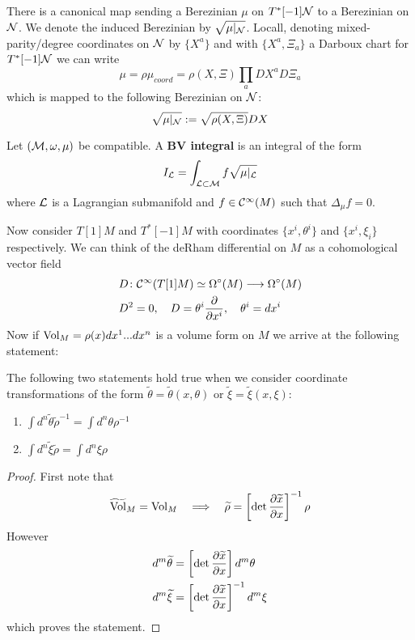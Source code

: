 
There is a canonical map sending a Berezinian $\mu$ on $T^*[-1]\mathcal{N}$ to a Berezinian on $\mathcal{N}$. We denote the induced Berezinian by $\sqrt{\mu|_{\mathcal{N}}}$. Locall, denoting mixed-parity/degree coordinates on $\mathcal{N}$ by $\{X^a\}$ and with $\{X^a, \Xi_a \}$ a Darboux chart for $T^*[-1]\mathcal{N}$ we can write
\begin{equation}
  \mu = \rho \mu_{coord} = \rho(X, \Xi) \prod_a DX^a D\Xi_a
\end{equation}
which is mapped to the following Berezinian on $\mathcal{N}$:
\begin{equation}
  \sqrt{\mu|_{\mathcal{N}}} := \sqrt{\rho(X, \Xi)} DX
\end{equation}

\begin{definition}[BV Integral]
  Let $(\mathcal{M}, \omega, \mu)$ be compatible. A \textbf{BV integral} is an integral of the form
  \begin{equation}
    I_{\mathcal{L}} = \int_{\mathcal{L} \subset \mathcal{M}} f \sqrt{\mu|_{\mathcal{L}}}
  \end{equation}
  where $\mathcal{L}$ is a Lagrangian submanifold and $f \in \mathcal{C}^{\infty}(M)$ such that $\Delta_\mu f = 0$.
\end{definition}

Now consider $T[1]M$ and $T^*[-1]M$ with coordinates $\{x^i, \theta^i \}$ and $\{x^i, \xi_i \}$ respectively. We can think of the deRham differential on $M$ as a cohomological vector field
\begin{align}
  &D \colon \mathcal{C}^{\infty}(T[1]M) \simeq \Omega^\circ(M) \longrightarrow \Omega^\circ(M) \\
  &D^2 = 0, \quad D = \theta^i \frac{\partial }{\partial x^i}, \quad \theta^i = dx^i
\end{align}
Now if $\operatorname{Vol}_M = \rho(x) dx^1 ... dx^n$ is a volume form on $M$ we arrive at the following statement:

\begin{lem}
  The following two statements hold true when we consider coordinate transformations of the form $\widetilde{\theta} = \widetilde{\theta}(x, \theta)$ or $\widetilde{\xi} = \widetilde{\xi}(x, \xi)$:
  \begin{enumerate}
    \item $ \int d^n \widetilde{\theta} \widetilde{\rho}^{-1} = \int d^n \theta \rho^{-1} $
    \item $ \int d^n \widetilde{\xi} \widetilde{\rho} = \int d^n \xi \rho $
  \end{enumerate}
\begin{proof}
  First note that
  \begin{equation}
    \widetilde{\operatorname{Vol}}_M = \operatorname{Vol}_M \quad \Longrightarrow \quad \widetilde{\rho} = \left[ \det \frac{\partial \widetilde{x}}{\partial x} \right]^{-1} \rho
  \end{equation}
  However
  \begin{align}
    d^m \widetilde{\theta} &= \left[ \det \frac{\partial \widetilde{x}}{\partial x} \right] d^m \theta \\
    d^m \widetilde{\xi} &= \left[ \det \frac{\partial \widetilde{x}}{\partial x} \right]^{-1} d^m \xi
  \end{align}
  which proves the statement.
\end{proof}
\end{lem}

